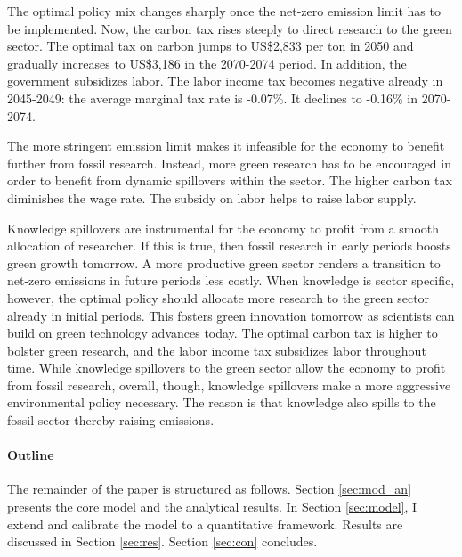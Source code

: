 The optimal policy mix changes sharply once the net-zero emission limit has to be implemented. Now, the carbon tax rises steeply to direct research to the green sector. The optimal tax on carbon jumps to US\$2,833 per ton in 2050 and gradually increases to US\$3,186 in the 2070-2074 period. In addition, the government subsidizes labor. The labor income tax becomes negative already in 2045-2049: the average marginal tax rate is -0.07\%. It declines to -0.16\% in 2070-2074.

The more stringent emission limit makes it infeasible for the economy to benefit further from fossil research. Instead, more green research has to be encouraged in order to benefit from dynamic spillovers within the sector. The higher carbon tax diminishes the wage rate. The subsidy on labor helps to raise labor supply.


Knowledge spillovers are instrumental for the economy to profit from a smooth allocation of researcher. If this is true, then fossil research in early periods boosts green growth tomorrow. A more productive green sector renders a transition to net-zero emissions in future periods less costly. When knowledge is sector specific, however, the optimal policy should allocate more research to the green sector already in initial periods. This fosters green innovation tomorrow as scientists can build on green technology advances today. The optimal carbon tax is higher to bolster green research, and the labor income tax subsidizes labor throughout time. While knowledge spillovers to the green sector allow the economy to profit from fossil research, overall, though, knowledge spillovers make a more aggressive environmental policy necessary. The reason is that knowledge also spills to the fossil sector thereby raising emissions.  




\paragraph{Outline}
The remainder of the paper is structured as follows. Section \ref{sec:mod_an} presents the core model and the analytical results. In Section \ref{sec:model}, I extend and calibrate the model to a quantitative framework.  Results are discussed in Section \ref{sec:res}. Section \ref{sec:con} concludes.